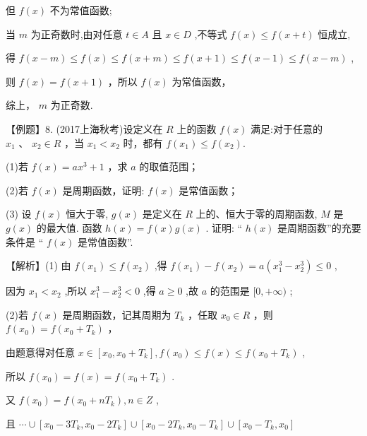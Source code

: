 \documentclass[10pt]{article}
\begin{document}
但 \(f\left( x\right)\) 不为常值函数;

当 \(m\) 为正奇数时,由对任意 \(t \in  A\) 且 \(x \in  D\) ,不等式 \(f\left( x\right)  \leq  f\left( {x + t}\right)\) 恒成立,

得 \(f\left( {x - m}\right)  \leq  f\left( x\right)  \leq  f\left( {x + m}\right)  \leq  f\left( {x + 1}\right)  \leq  f\left( {x - 1}\right)  \leq  f\left( {x - m}\right)\) ,

则 \(f\left( x\right)  = f\left( {x + 1}\right)\) ，所以 \(f\left( x\right)\) 为常值函数，

综上， \(m\) 为正奇数.

【例题】8. (2017上海秋考)设定义在 \(R\) 上的函数 \(f\left( x\right)\) 满足:对于任意的 \({x}_{1}\text{ 、 }{x}_{2} \in  R\) ，当 \({x}_{1} < {x}_{2}\) 时，都有 \(f\left( {x}_{1}\right)  \leq  f\left( {x}_{2}\right) .\)

(1)若 \(f\left( x\right)  = a{x}^{3} + 1\) ，求 \(a\) 的取值范围；

(2)若 \(f\left( x\right)\) 是周期函数，证明: \(f\left( x\right)\) 是常值函数；

(3) 设 \(f\left( x\right)\) 恒大于零, \(g\left( x\right)\) 是定义在 \(R\) 上的、恒大于零的周期函数, \(M\) 是 \(g\left( x\right)\) 的最大值. 函数 \(h\left( x\right)  = f\left( x\right) g\left( x\right)\) . 证明: “ \(h\left( x\right)\) 是周期函数”的充要条件是 “ \(f\left( x\right)\) 是常值函数”.

【解析】(1) 由 \(f\left( {x}_{1}\right)  \leq  f\left( {x}_{2}\right)\) ,得 \(f\left( {x}_{1}\right)  - f\left( {x}_{2}\right)  = a\left( {{x}_{1}^{3} - {x}_{2}^{3}}\right)  \leq  0\) ,

因为 \({x}_{1} < {x}_{2}\) ,所以 \({x}_{1}^{3} - {x}_{2}^{3} < 0\) ,得 \(a \geq  0\) ,故 \(a\) 的范围是 \(\lbrack 0, + \infty )\) ;

(2)若 \(f\left( x\right)\) 是周期函数，记其周期为 \({T}_{k}\) ，任取 \({x}_{0} \in  R\) ，则 \(f\left( {x}_{0}\right)  = f\left( {{x}_{0} + {T}_{k}}\right)\) ，

由题意得对任意 \(x \in  \left\lbrack  {{x}_{0},{x}_{0} + {T}_{k}}\right\rbrack  ,f\left( {x}_{0}\right)  \leq  f\left( x\right)  \leq  f\left( {{x}_{0} + {T}_{k}}\right)\) ,

所以 \(f\left( {x}_{0}\right)  = f\left( x\right)  = f\left( {{x}_{0} + {T}_{k}}\right)\) .

又 \(f\left( {x}_{0}\right)  = f\left( {{x}_{0} + n{T}_{k}}\right) ,n \in  Z\) ,

且 \(\cdots  \cup  \left\lbrack  {{x}_{0} - 3{T}_{k},{x}_{0} - 2{T}_{k}}\right\rbrack   \cup  \left\lbrack  {{x}_{0} - 2{T}_{k},{x}_{0} - {T}_{k}}\right\rbrack   \cup  \left\lbrack  {{x}_{0} - {T}_{k},{x}_{0}}\right\rbrack\)
\end{document}
